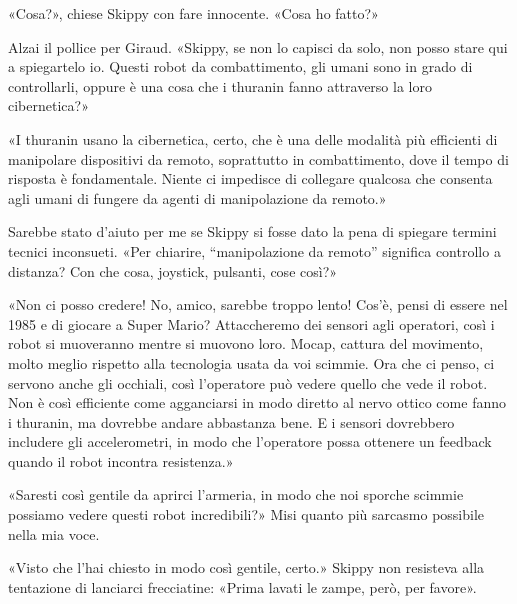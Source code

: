 «Cosa?», chiese Skippy con fare innocente. «Cosa ho fatto?»

Alzai il pollice per Giraud. «Skippy, se non lo capisci da solo, non
posso stare qui a spiegartelo io. Questi robot da combattimento, gli
umani sono in grado di controllarli, oppure è una cosa che i thuranin
fanno attraverso la loro cibernetica?»

«I thuranin usano la cibernetica, certo, che è una delle modalità più
efficienti di manipolare dispositivi da remoto, soprattutto in
combattimento, dove il tempo di risposta è fondamentale. Niente ci
impedisce di collegare qualcosa che consenta agli umani di fungere da
agenti di manipolazione da remoto.»

Sarebbe stato d'aiuto per me se Skippy si fosse dato la pena di spiegare
termini tecnici inconsueti. «Per chiarire, ``manipolazione da remoto''
significa controllo a distanza? Con che cosa, joystick, pulsanti, cose
così?»

«Non ci posso credere! No, amico, sarebbe troppo lento! Cos'è, pensi di
essere nel 1985 e di giocare a Super Mario? Attaccheremo dei sensori
agli operatori, così i robot si muoveranno mentre si muovono loro.
Mocap, cattura del movimento, molto meglio rispetto alla tecnologia
usata da voi scimmie. Ora che ci penso, ci servono anche gli occhiali,
così l'operatore può vedere quello che vede il robot. Non è così
efficiente come agganciarsi in modo diretto al nervo ottico come fanno i
thuranin, ma dovrebbe andare abbastanza bene. E i sensori dovrebbero
includere gli accelerometri, in modo che l'operatore possa ottenere un
feedback quando il robot incontra resistenza.»

«Saresti così gentile da aprirci l'armeria, in modo che noi sporche
scimmie possiamo vedere questi robot incredibili?» Misi quanto più
sarcasmo possibile nella mia voce.

«Visto che l'hai chiesto in modo così gentile, certo.» Skippy non
resisteva alla tentazione di lanciarci frecciatine: «Prima lavati le
zampe, però, per favore».

\hfill\break

